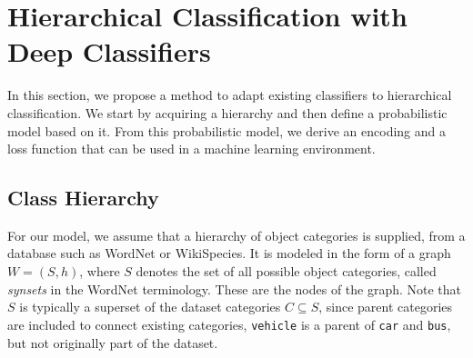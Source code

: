 \documentclass[10pt,twocolumn,letterpaper]{article}
\begin{document}
%
%



\section{Hierarchical Classification with Deep Classifiers}
In this section, we propose a method to adapt existing classifiers
to hierarchical classification. We start by acquiring a hierarchy and then define a probabilistic
model based on it. From this probabilistic model, we derive an encoding and a loss function
that can be used in a machine learning environment.

\subsection{Class Hierarchy}
For our model, we assume that a hierarchy of object categories is supplied,
\eg from a database such as WordNet\cite{Fellbaum1998WordNet} or WikiSpecies.
It is modeled in the form of a graph $W=(S,h)$, where $S$ denotes the set of all possible
object categories, called \emph{synsets} in the WordNet terminology.
These are the nodes of the graph. Note that $S$ is typically a superset of the dataset
categories $C \subseteq S$, since parent categories are included to connect existing categories,
\eg \texttt{vehicle} is a parent of \texttt{car} and \texttt{bus}, but not originally part
of the dataset.
\end{document}
